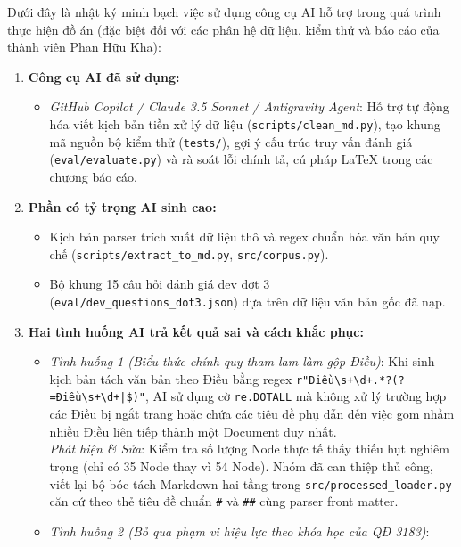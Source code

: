 Dưới đây là nhật ký minh bạch việc sử dụng công cụ AI hỗ trợ trong quá trình thực hiện đồ án (đặc biệt đối với các phân hệ dữ liệu, kiểm thử và báo cáo của thành viên Phan Hữu Kha):

\begin{enumerate}
  \item \textbf{Công cụ AI đã sử dụng:}
        \begin{itemize}
          \item \textit{GitHub Copilot / Claude 3.5 Sonnet / Antigravity Agent}: Hỗ trợ tự động hóa viết kịch bản tiền xử lý dữ liệu (\texttt{scripts/clean\_md.py}), tạo khung mã nguồn bộ kiểm thử (\texttt{tests/}), gợi ý cấu trúc truy vấn đánh giá (\texttt{eval/evaluate.py}) và rà soát lỗi chính tả, cú pháp LaTeX trong các chương báo cáo.
        \end{itemize}
  \item \textbf{Phần có tỷ trọng AI sinh cao:}
        \begin{itemize}
          \item Kịch bản parser trích xuất dữ liệu thô và regex chuẩn hóa văn bản quy chế (\texttt{scripts/extract\_to\_md.py}, \texttt{src/corpus.py}).
          \item Bộ khung 15 câu hỏi đánh giá dev đợt 3 (\texttt{eval/dev\_questions\_dot3.json}) dựa trên dữ liệu văn bản gốc đã nạp.
        \end{itemize}
  \item \textbf{Hai tình huống AI trả kết quả sai và cách khắc phục:}
        \begin{itemize}
          \item \textit{Tình huống 1 (Biểu thức chính quy tham lam làm gộp Điều)}:
                Khi sinh kịch bản tách văn bản theo Điều bằng regex \texttt{r"Điều\textbackslash{}s+\textbackslash{}d+.*?(?=Điều\textbackslash{}s+\textbackslash{}d+|\$)"}, AI sử dụng cờ \texttt{re.DOTALL} mà không xử lý trường hợp các Điều bị ngắt trang hoặc chứa các tiêu đề phụ dẫn đến việc gom nhầm nhiều Điều liên tiếp thành một Document duy nhất. \\
                \textit{Phát hiện \& Sửa}: Kiểm tra số lượng Node thực tế thấy thiếu hụt nghiêm trọng (chỉ có 35 Node thay vì 54 Node). Nhóm đã can thiệp thủ công, viết lại bộ bóc tách Markdown hai tầng trong \texttt{src/processed\_loader.py} căn cứ theo thẻ tiêu đề chuẩn \texttt{\#} và \texttt{\#\#} cùng parser front matter.
          \item \textit{Tình huống 2 (Bỏ qua phạm vi hiệu lực theo khóa học của QĐ 3183)}:

\end{itemize}
\end{enumerate}
